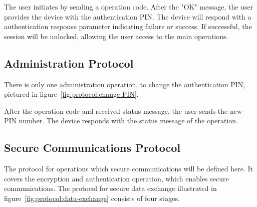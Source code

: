 The user initiates by sending a operation code. After the "OK" message, the user provides the device with the authentication \ac{PIN}. The device will respond with a authentication response parameter indicating failure or success. If successful, the session will be unlocked, allowing the user access to the main operations.

\subsection{Administration Protocol}\label{chap:implementation:protocol:admin}

There is only one administration operation, to change the authentication \ac{PIN}, pictured in figure~\ref{fig:protocol:change-PIN}.


After the operation code and received status message, the user sends the new \ac{PIN} number. The device responds with the status message of the operation.

\subsection{Secure Communications Protocol}\label{chap:implementation:protocol:comms}

The protocol for operations which secure communications will be defined here. It covers the encryption and authentication operation, which enables secure communications.%
The protocol for secure data exchange illustrated in figure~\ref{fig:protocol:data-exchange} consists of four stages.

